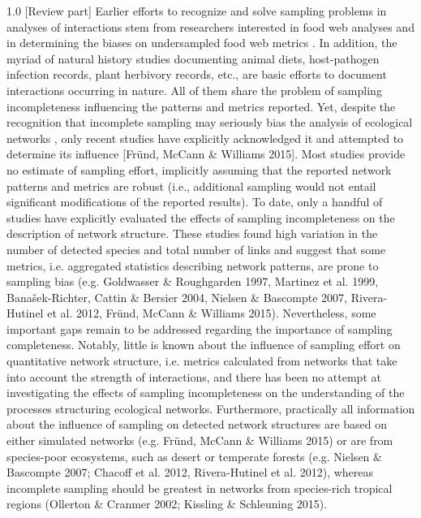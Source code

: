 \documentclass[a4paper,12pt]{article}
\begin{document}
\begin{spacing}{1.0}
[Review part]
 Earlier efforts to recognize and solve sampling problems in analyses of interactions stem from researchers interested in food web analyses and in determining the biases on undersampled food web metrics \citep{Bersier:2002p9371}\citep{Brose:2003wv}\citep{BanasekRichter:2004ik}. In addition, the myriad of natural history studies documenting animal diets, host-pathogen infection records, plant herbivory records, etc., are basic efforts to document interactions occurring in nature. All of them share the problem of sampling incompleteness influencing the patterns and metrics reported. Yet, despite the recognition that incomplete sampling may seriously bias the analysis of ecological networks \citep{E31/2562}, only recent studies have explicitly acknowledged it and attempted to determine its influence \citep{Ollerton:2002jw}\citep{Nielsen:2007}\citep{Vazquez:2009p82}\citep{Gibson:2011eh}\citep{Olesen:2011a}\citep{Chacoff:2012}\citep{RiveraHutinel:2012vn}[Fründ, McCann \& Williams 2015]. Most studies provide no estimate of sampling effort, implicitly assuming that the reported network patterns and metrics are robust (i.e., additional sampling would not entail significant modifications of the reported results).
 To date, only a handful of studies have explicitly evaluated the effects of sampling incompleteness on the description of network structure. These studies found high variation in the number of detected species and total number of links and suggest that some metrics, i.e. aggregated statistics describing network patterns, are prone to sampling bias (e.g. Goldwasser \& Roughgarden 1997, Martinez et al. 1999, Banašek-Richter, Cattin \& Bersier 2004, Nielsen \& Bascompte 2007, Rivera-Hutinel et al. 2012, Fründ, McCann \& Williams 2015). Nevertheless, some important gaps remain to be addressed regarding the importance of sampling completeness. Notably, little is known about the influence of sampling effort on quantitative network structure, i.e. metrics calculated from networks that take into account the strength of interactions, and there has been no attempt at investigating the effects of sampling incompleteness on the understanding of the processes structuring ecological networks. Furthermore, practically all information about the influence of sampling on detected network structures are based on either simulated networks (e.g. Fründ, McCann \& Williams 2015) or are from species-poor ecosystems, such as desert or temperate forests (e.g. Nielsen \& Bascompte 2007; Chacoff et al. 2012, Rivera-Hutinel et al. 2012), whereas incomplete sampling should be greatest in networks from species-rich tropical regions (Ollerton \& Cranmer 2002; Kissling \& Schleuning 2015).


\end{spacing}
\end{document}
